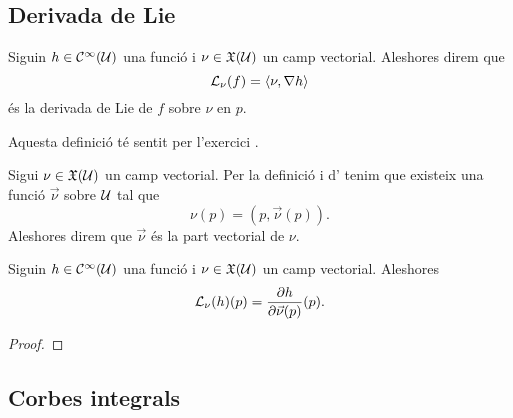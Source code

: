 \documentclass[../Apunts.tex]{subfiles}
\begin{document}
	\subsection{Derivada de Lie}
	\begin{definition}
		\label{def:derivada de Lie}
		Siguin \(h\in\mathcal{C}^{\infty}(\mathcal{U})\) una funció i \(\nu\in\mathfrak{X}(\mathcal{U})\) un camp vectorial. Aleshores direm que
		\[\Lie_{\nu}(f)=\prodesc{\nu}{\nabla h}\]
		 és la derivada de Lie de \(f\) sobre \(\nu\) en \(p\).
		 
		 Aquesta definició té sentit per l'exercici .
	\end{definition}
	\begin{definition}
		\label{def:part vectorial d'un camp vectorial}
		Sigui \(\nu\in\mathfrak{X}(\mathcal{U})\) un camp vectorial. Per la definició  i d' tenim que existeix una funció \(\vec{\nu}\) sobre \(\mathcal{U}\) tal que
		\[\nu(p)=(p,\vec{\nu}(p)).\]
		Aleshores direm que \(\vec{\nu}\) és la part vectorial de \(\nu\).
	\end{definition}
	\begin{lemma}
		\label{lemma:la derivada de Lie és la derivada direccional}
		Siguin \(h\in\mathcal{C}^{\infty}(\mathcal{U})\) una funció i \(\nu\in\mathfrak{X}(\mathcal{U})\) un camp vectorial.
		Aleshores
		\[\mathcal{L}_{\nu}(h)(p)=\frac{\partial h}{\partial\vec{\nu}(p)}(p).\]
	\end{lemma}
	\begin{proof}
	\end{proof}
	\subsection{Corbes integrals}
\end{document}
